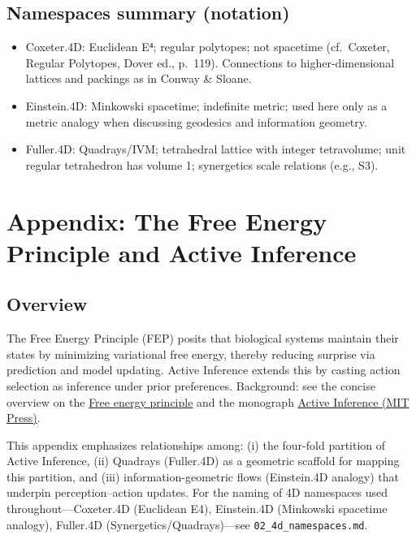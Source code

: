 \documentclass[
  10pt,
]{article}
\providecommand{\tightlist}{%
  \setlength{\itemsep}{0pt}\setlength{\parskip}{0pt}}
\begin{document}
\hypertarget{namespaces-summary-notation}{%
\subsection{Namespaces summary
(notation)}\label{namespaces-summary-notation}}

\begin{itemize}
\tightlist
\item
  Coxeter.4D: Euclidean E⁴; regular polytopes; not spacetime
  (cf.~Coxeter, Regular Polytopes, Dover ed., p.~119). Connections to
  higher-dimensional lattices and packings as in Conway \& Sloane.
\item
  Einstein.4D: Minkowski spacetime; indefinite metric; used here only as
  a metric analogy when discussing geodesics and information geometry.
\item
  Fuller.4D: Quadrays/IVM; tetrahedral lattice with integer tetravolume;
  unit regular tetrahedron has volume 1; synergetics scale relations
  (e.g., S3). 
\end{itemize}

\hypertarget{appendix-the-free-energy-principle-and-active-inference}{%
\section{Appendix: The Free Energy Principle and Active
Inference}\label{appendix-the-free-energy-principle-and-active-inference}}

\hypertarget{overview}{%
\subsection{Overview}\label{overview}}

The Free Energy Principle (FEP) posits that biological systems maintain
their states by minimizing variational free energy, thereby reducing
surprise via prediction and model updating. Active Inference extends
this by casting action selection as inference under prior preferences.
Background: see the concise overview on the
\href{https://en.wikipedia.org/wiki/Free_energy_principle}{Free energy
principle} and the monograph
\href{https://direct.mit.edu/books/oa-monograph/5299/Active-InferenceThe-Free-Energy-Principle-in-Mind}{Active
Inference (MIT Press)}.

This appendix emphasizes relationships among: (i) the four-fold
partition of Active Inference, (ii) Quadrays (Fuller.4D) as a geometric
scaffold for mapping this partition, and (iii) information-geometric
flows (Einstein.4D analogy) that underpin perception--action updates.
For the naming of 4D namespaces used throughout---Coxeter.4D (Euclidean
E4), Einstein.4D (Minkowski spacetime analogy), Fuller.4D
(Synergetics/Quadrays)---see \texttt{02\_4d\_namespaces.md}.
\end{document}

